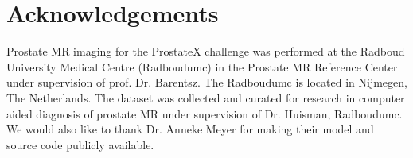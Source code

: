\documentclass[num-refs]{wiley-article}
\begin{document}
\section{Acknowledgements}
Prostate MR imaging for the ProstateX challenge was performed at the Radboud University Medical Centre (Radboudumc) in the Prostate MR Reference Center under supervision of prof. Dr. Barentsz. The Radboudumc is located in Nijmegen, The Netherlands. The dataset was collected and curated for research in computer aided diagnosis of prostate MR under supervision of Dr. Huisman, Radboudumc. We would also like to thank Dr. Anneke Meyer for making their model and source code publicly available.





\end{document}
